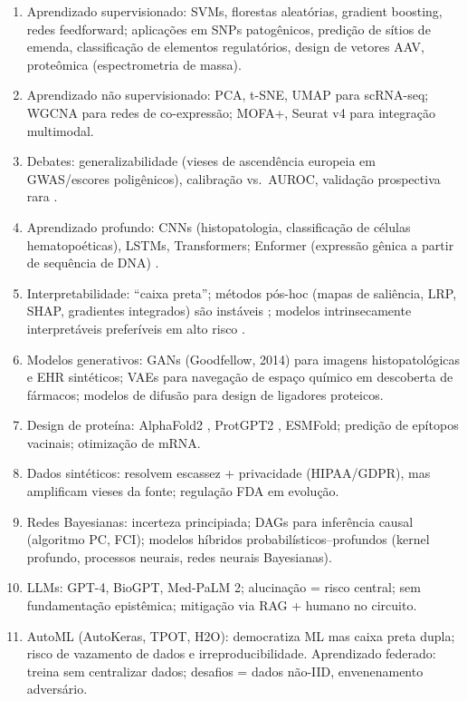 \clearpage
\begin{revise}
\begin{enumerate}
    \item Aprendizado supervisionado: SVMs, florestas aleatórias, gradient boosting, redes feedforward; aplicações em SNPs patogênicos, predição de sítios de emenda, classificação de elementos regulatórios, design de vetores AAV, proteômica (espectrometria de massa).
    \item Aprendizado não supervisionado: PCA, t-SNE, UMAP para scRNA-seq; WGCNA para redes de co-expressão; MOFA+, Seurat v4 para integração multimodal.
    \item Debates: generalizabilidade (vieses de ascendência europeia em GWAS/escores poligênicos), calibração vs.\ AUROC, validação prospectiva rara \parencite{popejoy2016,obermeyer2019}.
    \item Aprendizado profundo: CNNs (histopatologia, classificação de células hematopoéticas), LSTMs, Transformers; Enformer (expressão gênica a partir de sequência de DNA) \parencite{avsec2021}.
    \item Interpretabilidade: ``caixa preta''; métodos pós-hoc (mapas de saliência, LRP, SHAP, gradientes integrados) são instáveis \parencite{adebayo2018}; modelos intrinsecamente interpretáveis preferíveis em alto risco \parencite{rudin2019}.
    \item Modelos generativos: GANs (Goodfellow, 2014) para imagens histopatológicas e EHR sintéticos; VAEs para navegação de espaço químico em descoberta de fármacos; modelos de difusão para design de ligadores proteicos.
    \item Design de proteína: AlphaFold2 \parencite{jumper2021}, ProtGPT2 \parencite{ferruz2022}, ESMFold; predição de epítopos vacinais; otimização de mRNA.
    \item Dados sintéticos: resolvem escassez + privacidade (HIPAA/GDPR), mas amplificam vieses da fonte; regulação FDA em evolução.
    \item Redes Bayesianas: incerteza principiada; DAGs para inferência causal (algoritmo PC, FCI); modelos híbridos probabilísticos--profundos (kernel profundo, processos neurais, redes neurais Bayesianas).
    \item LLMs: GPT-4, BioGPT, Med-PaLM 2; alucinação = risco central; sem fundamentação epistêmica; mitigação via RAG + humano no circuito.
    \item AutoML (AutoKeras, TPOT, H2O): democratiza ML mas caixa preta dupla; risco de vazamento de dados e irreproducibilidade. Aprendizado federado: treina sem centralizar dados; desafios = dados não-IID, envenenamento adversário.
\end{enumerate}
\end{revise}

\clearpage

\printbibliography[heading=subbibliography,title={Referências}]

